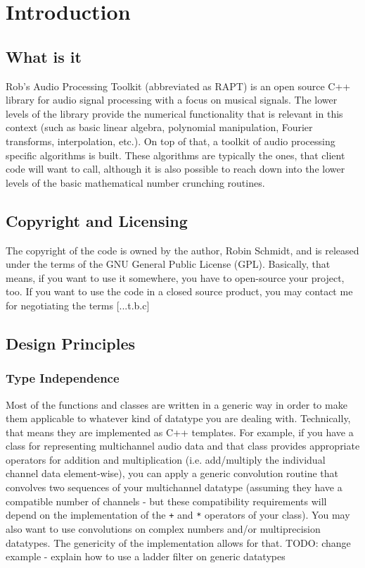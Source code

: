 \chapter{Introduction}

\section{What is it}
Rob's Audio Processing Toolkit (abbreviated as RAPT) is an open source C++ library for audio signal processing with a focus on musical signals. The lower levels of the library provide the numerical functionality that is relevant in this context (such as basic linear algebra, polynomial manipulation, Fourier transforms, interpolation, etc.). On top of that, a toolkit of audio processing specific algorithms is built. These algorithms are typically the ones, that client code will want to call, although it is also possible to reach down into the lower levels of the basic mathematical number crunching routines.

\section{Copyright and Licensing}
The copyright of the code is owned by the author, Robin Schmidt, and is released under the terms of the GNU General Public License (GPL). Basically, that means, if you want to use it somewhere, you have to open-source your project, too. If you want to use the code in a closed source product, you may contact me for negotiating the terms [...t.b.c]


\section{Design Principles}

\subsection{Type Independence}
Most of the functions and classes are written in a generic way in order to make them applicable to whatever kind of datatype you are dealing with. Technically, that means they are implemented as C++ templates. For example, if you have a class for representing multichannel audio data and that class provides appropriate operators for addition and multiplication (i.e. add/multiply the individual channel data element-wise), you can apply a generic convolution routine that convolves two sequences of your multichannel datatype (assuming they have a compatible number of channels - but these compatibility requirements will depend on the implementation of the \texttt{+} and \texttt{*} operators of your class). You may also want to use convolutions on complex numbers and/or multiprecision datatypes. The genericity of the implementation allows for that. TODO: change example  - explain how to use a ladder filter on generic datatypes


